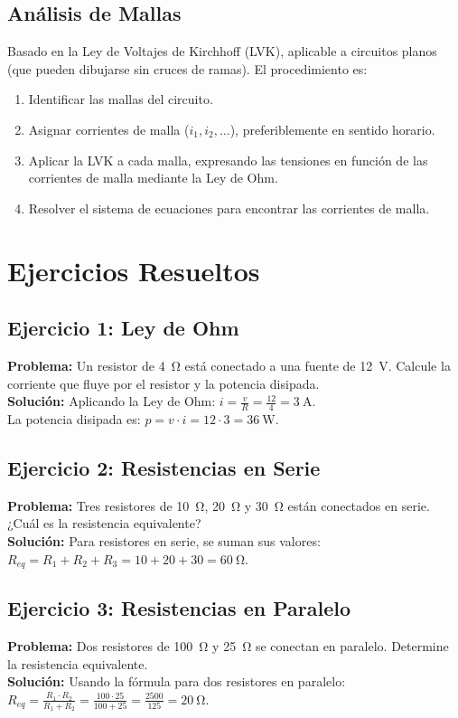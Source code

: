 \documentclass[12pt, a4paper]{article}
\begin{document}
\subsection{Análisis de Mallas}
Basado en la Ley de Voltajes de Kirchhoff (LVK), aplicable a circuitos planos (que pueden dibujarse sin cruces de ramas). El procedimiento es:
\begin{enumerate}[noitemsep]
    \item Identificar las mallas del circuito.
    \item Asignar corrientes de malla ($i_1, i_2, \dots$), preferiblemente en sentido horario.
    \item Aplicar la LVK a cada malla, expresando las tensiones en función de las corrientes de malla mediante la Ley de Ohm.
    \item Resolver el sistema de ecuaciones para encontrar las corrientes de malla.
\end{enumerate}

\newpage
\section{Ejercicios Resueltos}

\subsection*{Ejercicio 1: Ley de Ohm}
\textbf{Problema:} Un resistor de \SI{4}{\ohm} está conectado a una fuente de \SI{12}{\volt}. Calcule la corriente que fluye por el resistor y la potencia disipada. \\
\textbf{Solución:} 
Aplicando la Ley de Ohm: $i = \frac{v}{R} = \frac{12}{4} = \SI{3}{\ampere}$.\\
La potencia disipada es: $p = v \cdot i = 12 \cdot 3 = \SI{36}{\watt}$.

\subsection*{Ejercicio 2: Resistencias en Serie}
\textbf{Problema:} Tres resistores de \SI{10}{\ohm}, \SI{20}{\ohm} y \SI{30}{\ohm} están conectados en serie. ¿Cuál es la resistencia equivalente? \\
\textbf{Solución:} 
Para resistores en serie, se suman sus valores:
$R_{eq} = R_1 + R_2 + R_3 = 10 + 20 + 30 = \SI{60}{\ohm}$.

\subsection*{Ejercicio 3: Resistencias en Paralelo}
\textbf{Problema:} Dos resistores de \SI{100}{\ohm} y \SI{25}{\ohm} se conectan en paralelo. Determine la resistencia equivalente.\\
\textbf{Solución:} 
Usando la fórmula para dos resistores en paralelo:
$R_{eq} = \frac{R_1 \cdot R_2}{R_1 + R_2} = \frac{100 \cdot 25}{100 + 25} = \frac{2500}{125} = \SI{20}{\ohm}$.
\end{document}
